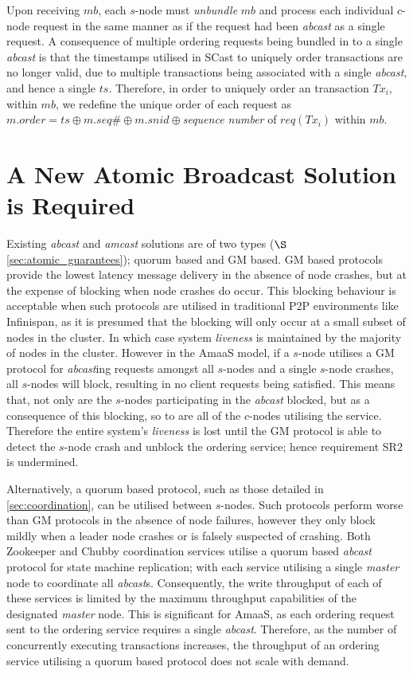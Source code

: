     Upon receiving $mb$, each $s$-node must \emph{unbundle} $mb$ and process each individual $c$-node request in the same manner as if the request had been \emph{abcast} as a single request.  A consequence of multiple ordering requests being bundled in to a single \emph{abcast} is that the timestamps utilised in \textsf{SCast} to uniquely order transactions are no longer valid, due to multiple transactions being associated with a single \emph{abcast}, and hence a single $ts$.  Therefore, in order to uniquely order an transaction $Tx_i$, within $mb$, we redefine the unique order of each request as $m.order = ts\oplus m.seq\# \oplus m.snid \oplus$\emph{sequence number} of $req(Tx_i)$ within $mb$.  

\section{A New Atomic Broadcast Solution is Required}
Existing \emph{abcast} and \emph{amcast} solutions are of two types ($\S$ \ref{sec:atomic_guarantees}); quorum based and GM based.  GM based protocols provide the lowest latency message delivery in the absence of node crashes, but at the expense of blocking when node crashes do occur.  This blocking behaviour is acceptable when such protocols are utilised in traditional P2P environments like Infinispan, as it is presumed that the blocking will only occur at a small subset of nodes in the cluster.  In which case system \emph{liveness} is maintained by the majority of nodes in the cluster.  However in the \textsf{AmaaS} model, if a $s$-node utilises a GM protocol for \emph{abcast}ing requests amongst all $s$-nodes and a single $s$-node crashes, all $s$-nodes will block, resulting in no client requests being satisfied. This means that, not only are the $s$-nodes participating in the \emph{abcast} blocked, but as a consequence of this blocking, so to are all of the $c$-nodes utilising the service.  Therefore the entire system's \emph{liveness} is lost until the GM protocol is able to detect the $s$-node crash and unblock the ordering service; hence requirement SR2 is undermined.  

Alternatively, a quorum based protocol, such as those detailed in \ref{sec:coordination}, can be utilised between $s$-nodes.  Such protocols perform worse than GM protocols in the absence of node failures, however they only block mildly when a leader node crashes or is falsely suspected of crashing.  Both Zookeeper and Chubby coordination services utilise a quorum based \emph{abcast} protocol for state machine replication; with each service utilising a single \emph{master} node to coordinate all \emph{abcast}s.  Consequently, the write throughput of each of these services is limited by the maximum throughput capabilities of the designated \emph{master} node.  This is significant for \textsf{AmaaS}, as each ordering request sent to the ordering service requires a single \emph{abcast}.  Therefore, as the number of concurrently executing transactions increases, the throughput of an ordering service utilising a quorum based protocol does not scale with demand.    

